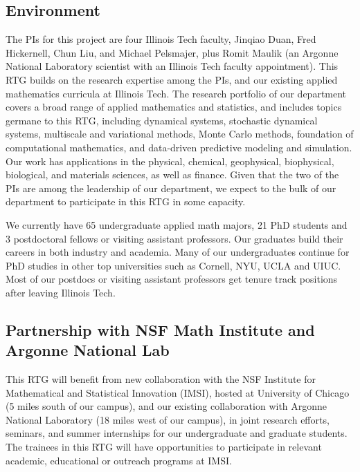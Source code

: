 \documentclass[11pt]{NSFamsart}
\begin{document}
\subsection*{Environment} The PIs for this project are four Illinois Tech faculty,  Jinqiao Duan, Fred Hickernell, Chun Liu, and Michael Pelsmajer, plus Romit Maulik (an Argonne National Laboratory scientist with an Illinois Tech faculty appointment). This RTG builds on the research expertise among the PIs, and our existing applied mathematics curricula at Illinois Tech.  The research portfolio of our department covers a broad range of applied mathematics and statistics, and includes topics germane to this RTG, including dynamical systems, stochastic dynamical systems, multiscale and variational methods,  Monte Carlo methods, foundation of computational mathematics, and data-driven predictive modeling and simulation. Our work has applications in the physical, chemical, geophysical, biophysical, biological, and materials sciences, as well as finance.  Given that the two of the PIs are among the leadership of our department, we expect to the bulk of our department to participate in this RTG in some capacity.


We currently have 65 undergraduate applied math majors, 21 PhD students and 3 postdoctoral fellows or visiting assistant professors. Our graduates build their careers in  both industry   and academia. Many of our undergraduates continue for PhD studies in other top universities such as Cornell, NYU, UCLA and UIUC. Most of our postdocs or visiting assistant professors get tenure track positions after leaving Illinois Tech.

  
 
 
\subsection*{Partnership with NSF Math Institute and Argonne National Lab}
This RTG will benefit from new collaboration with the NSF Institute for Mathematical and Statistical Innovation (IMSI), hosted at University of Chicago (5 miles south of our campus), and 
our existing collaboration with  Argonne National Laboratory (18 miles west of our campus),  in joint research   efforts, seminars, and summer internships for our undergraduate and graduate students. The trainees in this RTG will have opportunities to participate in relevant academic, educational or outreach programs at IMSI.
 
\end{document}
